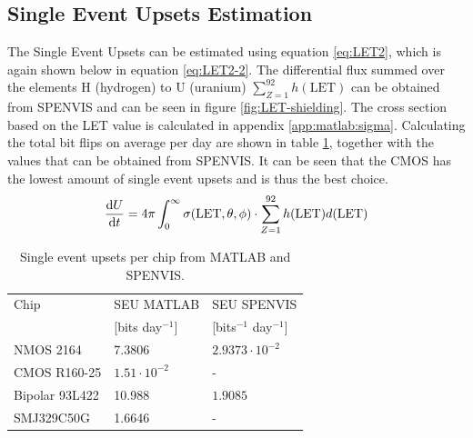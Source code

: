 \subsection{\label{subsec:SEU-esti}Single Event Upsets Estimation}
The Single Event Upsets can be estimated using equation \ref{eq:LET2}, which is again shown below in equation \ref{eq:LET2-2}. The differential flux summed over the elements H (hydrogen) to U (uranium) $\sum^{92}_{Z=1} h(\text{LET})$ can be obtained from SPENVIS and can be seen in figure \ref{fig:LET-shielding}. The cross section based on the LET value is calculated in appendix \ref{app:matlab:sigma}. Calculating the total bit flips on average per day are shown in table \ref{tab:SEU-estimation}, together with the values that can be obtained from SPENVIS. It can be seen that the CMOS has the lowest amount of single event upsets and is thus the best choice.
\begin{equation}
\dv{U}{t} = 4 \pi \int^{\infty}_0 \sigma(\text{LET}, \theta, \phi) \cdot \sum^{92}_{Z=1} h(\text{LET}) d(\text{LET})\label{eq:LET2-2}
\end{equation}



\begin{table}[H]
\centering
\begin{tabular}{|l|l|l|}
\hline
Chip & SEU MATLAB & SEU SPENVIS \\
	 & [bits day$^{-1}$] & [bits$^{-1}$ day$^{-1}$] \\\hline
NMOS 2164		& 7.3806 & $2.9373 \cdot 10^{-2}$ \\\hline
CMOS R160-25	& $1.51 \cdot 10^{-2}$ & - \\\hline
Bipolar 93L422	& 10.988 & $1.9085$ \\\hline
SMJ329C50G		& 1.6646 & - \\\hline
\end{tabular}
\caption{Single event upsets per chip from MATLAB and SPENVIS.}
\label{tab:SEU-estimation}
\end{table}






